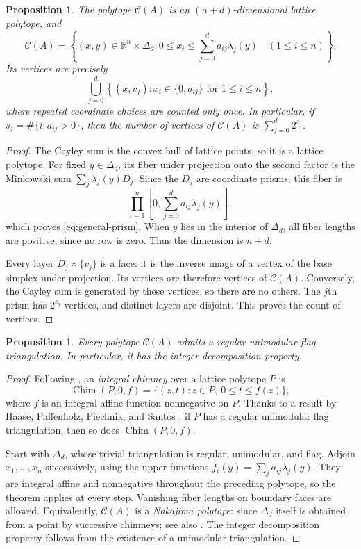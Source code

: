 \documentclass[11pt, letterpaper, english]{amsart}
\theoremstyle{teoremas}
\newtheorem{proposition}[theorem]{Proposition}
\theoremstyle{definition}
\newcommand{\R}{\mathbb{R}}
\newcommand{\cC}{\mathcal C}
\begin{document}
\begin{proposition}\label{prop:prisms}
The polytope $\cC(A)$ is an $(n+d)$-dimensional lattice polytope, and
\begin{equation}\label{eq:general-prism}
 \cC(A)=\left\{(x,y)\in\R^n\times\Delta_d:
 0\le x_i\le\sum_{j=0}^d a_{ij}\lambda_j(y)
 \quad(1\le i\le n)\right\}.
\end{equation}
Its vertices are precisely
\[
 \bigcup_{j=0}^d
 \left\{(x,v_j):x_i\in\{0,a_{ij}\}\text{ for }1\le i\le n\right\},
\]
where repeated coordinate choices are counted only once. In particular,
if $s_j=\#\{i:a_{ij}>0\}$, then the number of vertices of $\mathcal{C}(A)$ is $\sum_{j=0}^d 2^{s_j}$.
\end{proposition}
\begin{proof}
The Cayley sum is the convex hull of lattice points, so it is a lattice
polytope. For fixed $y\in\Delta_d$, its fiber under projection onto
the second factor is the Minkowski sum $\sum_j\lambda_j(y)D_j$.
Since the $D_j$ are coordinate prisms, this fiber is
\[
 \prod_{i=1}^n\left[0,\sum_{j=0}^d a_{ij}\lambda_j(y)\right],
\]
which proves \eqref{eq:general-prism}. When $y$ lies in the interior
of $\Delta_d$, all fiber lengths are positive, since no row is zero.
Thus the dimension is $n+d$.

Every layer $D_j\times\{v_j\}$ is a face: it is the inverse image of
a vertex of the base simplex under projection. Its vertices are
therefore vertices of $\cC(A)$. Conversely, the Cayley sum is generated
by these vertices, so there are no others. The $j$th prism has $2^{s_j}$
vertices, and distinct layers are disjoint. This proves the count of vertices.
\end{proof}

\begin{proposition}\label{prop:triangulations}
Every polytope $\cC(A)$ admits a regular unimodular flag triangulation.
In particular, it has the integer decomposition property.
\end{proposition}
\begin{proof}
Following \cite{haase-paffenholz-piechnik-santos}, an \emph{integral chimney} over a lattice polytope $P$ is
\[
 \operatorname{Chim}(P,0,f)=\{(z,t):z\in P,\ 0\le t\le f(z)\},
\]
where $f$ is an integral affine function nonnegative on $P$.
Thanks to a result by Haase, Paffenholz, Piechnik, and Santos \cite[Theorem~2.8]{haase-paffenholz-piechnik-santos}, if $P$ has a regular unimodular flag triangulation, then so does $\operatorname{Chim}(P,0,f)$.

Start with $\Delta_d$, whose trivial triangulation is regular,
unimodular, and flag. Adjoin $x_1,\ldots,x_n$ successively, using
the upper functions $f_i(y)=\sum_j a_{ij}\lambda_j(y)$.
They are integral affine and nonnegative throughout the preceding
polytope, so the theorem applies at every step. Vanishing fiber lengths
on boundary faces are allowed. Equivalently, $\cC(A)$ is a \emph{Nakajima
polytope}: since $\Delta_d$ itself is obtained from a point by successive
chimneys; see also
\cite[Corollary~2.9]{haase-paffenholz-piechnik-santos}.
The integer decomposition property follows from the existence of a
unimodular triangulation.
\end{proof}
\end{document}
